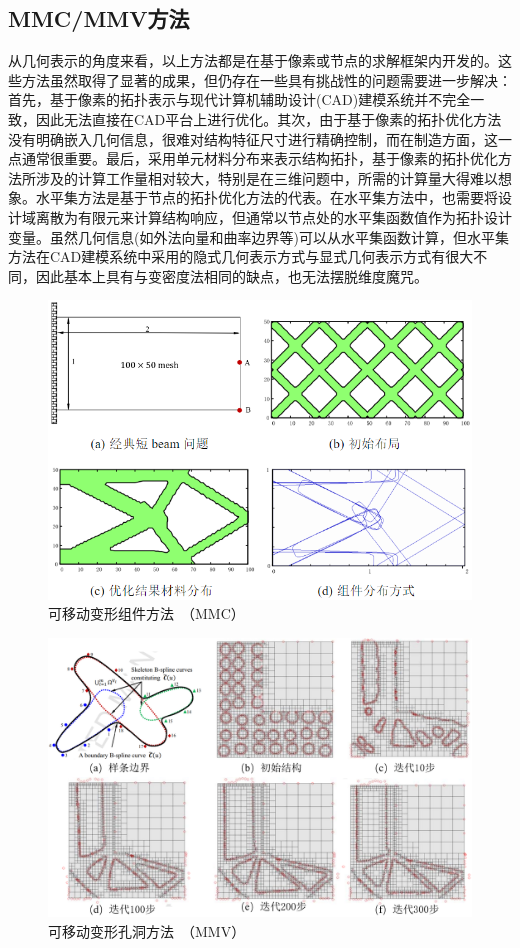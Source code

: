 \subsection{MMC/MMV方法}
从几何表示的角度来看，以上方法都是在基于像素或节点的求解框架内开发的。这些方法虽然取得了显著的成果，但仍存在一些具有挑战性的问题需要进一步解决：
首先，基于像素的拓扑表示与现代计算机辅助设计(CAD)建模系统并不完全一致，因此无法直接在CAD平台上进行优化。其次，由于基于像素的拓扑优化方法没有明确嵌入几何信息，很难对结构特征尺寸进行精确控制，而在制造方面，这一点通常很重要。最后，采用单元材料分布来表示结构拓扑，基于像素的拓扑优化方法所涉及的计算工作量相对较大，特别是在三维问题中，所需的计算量大得难以想象。水平集方法是基于节点的拓扑优化方法的代表。在水平集方法中，也需要将设计域离散为有限元来计算结构响应，但通常以节点处的水平集函数值作为拓扑设计变量。虽然几何信息(如外法向量和曲率边界等)可以从水平集函数计算，但水平集方法在CAD建模系统中采用的隐式几何表示方式与显式几何表示方式有很大不同，因此基本上具有与变密度法相同的缺点，也无法摆脱维度魔咒。
\begin{figure}[htpb]
\centering
\includegraphics[width=1.0\linewidth]{./figures/intro-mmc}
\caption{可移动变形组件方法~\cite{Zhang2014}（MMC）}
\label{MMC}
\end{figure}
\begin{figure}[htpb]
\centering
\includegraphics[width=1.0\linewidth]{./figures/intro-mmv}
\caption{可移动变形孔洞方法~\cite{zhang2018moving}（MMV）}
\label{MMV}
\end{figure}
